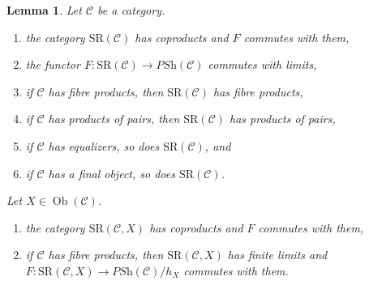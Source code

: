 \documentclass[10pt,a4paper]{article}
\theoremstyle{plain}
\newtheorem{lemma}[subsection]{Lemma}
\theoremstyle{definition}
\theoremstyle{remark}
\numberwithin{equation}{subsection}
\def\Ob{\mathop{\mathrm{Ob}}\nolimits}
\begin{document}
\begin{lemma}
\label{lemma-coprod-prod-SR}
Let $\mathcal{C}$ be a category.
\begin{enumerate}
\item the category $\text{SR}(\mathcal{C})$ has coproducts
and $F$ commutes with them,
\item the functor $F : \text{SR}(\mathcal{C}) \to \textit{PSh}(\mathcal{C})$
commutes with limits,
\item if $\mathcal{C}$ has fibre products, then $\text{SR}(\mathcal{C})$
has fibre products,
\item if $\mathcal{C}$ has products of pairs, then
$\text{SR}(\mathcal{C})$ has products of pairs,
\item if $\mathcal{C}$ has equalizers, so does $\text{SR}(\mathcal{C})$, and
\item if $\mathcal{C}$ has a final object, so does $\text{SR}(\mathcal{C})$.
\end{enumerate}
Let $X \in \Ob(\mathcal{C})$.
\begin{enumerate}
\item the category $\text{SR}(\mathcal{C}, X)$ has coproducts
and $F$ commutes with them,
\item if $\mathcal{C}$ has fibre products, then $\text{SR}(\mathcal{C}, X)$
has finite limits and
$F : \text{SR}(\mathcal{C}, X) \to \textit{PSh}(\mathcal{C})/h_X$
commutes with them.
\end{enumerate}
\end{lemma}
\end{document}
